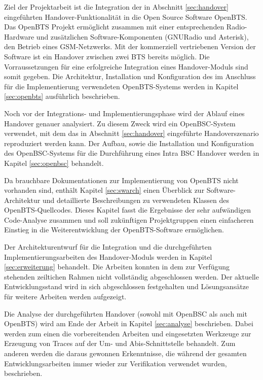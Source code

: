 Ziel der Projektarbeit ist die Integration der in Abschnitt \ref{sec:handover} eingeführten Handover-Funktionalität in die Open Source Software OpenBTS. Das OpenBTS Projekt ermöglicht zusammen mit einer entsprechenden Radio-Hardware und zusätzlichen Software-Komponenten (GNURadio und Asterisk), den Betrieb eines GSM-Netzwerks. Mit der kommerziell vertriebenen Version der Software ist ein Handover zwischen zwei BTS bereits möglich. Die Vorraussetzungen für eine erfolgreiche Integration eines Handover-Moduls sind somit gegeben. Die Architektur, Installation und Konfiguration des im Anschluss für die Implementierung verwendeten OpenBTS-Systems werden in Kapitel \ref{sec:openbts} ausführlich beschrieben.

Noch vor der Integrations- und Implementierungsphase wird der Ablauf eines Handover genauer analysiert. Zu diesem Zweck wird ein OpenBSC-System verwendet, mit dem das in Abschnitt \ref{sec:handover} eingeführte Handoverszenario reproduziert werden kann. Der Aufbau, sowie die Installation und Konfiguration des OpenBSC-Systems für die Durchführung eines Intra BSC Handover werden in Kapitel \ref{sec:openbsc} behandelt.

Da brauchbare Dokumentationen zur Implementierung von OpenBTS nicht vorhanden sind, enthält Kapitel \ref{sec:swarch} einen Überblick zur Software-Architektur und detaillierte Beschreibungen zu verwendeten Klassen des OpenBTS-Quellcodes. Dieses Kapitel fasst die Ergebnisse der sehr aufwändigen Code-Analyse zusammen und soll zukünftigen Projektgruppen einen einfacheren Einstieg in die Weiterentwicklung der OpenBTS-Software ermöglichen.

Der Architekturentwurf für die Integration und die durchgeführten Implementierungsarbeiten des Handover-Moduls werden in Kapitel \ref{sec:erweiterung} behandelt. Die Arbeiten konnten in dem zur Verfügung stehenden zeiltichen Rahmen nicht vollständig abgeschlossen werden. Der aktuelle Entwicklungsstand wird in sich abgeschlossen festgehalten und Lösungsansätze für weitere Arbeiten werden aufgezeigt.

Die Analyse der durchgeführten Handover (sowohl mit OpenBSC als auch mit OpenBTS) wird am Ende der Arbeit in Kapitel \ref{sec:analyse} beschrieben. Dabei werden zum einen die vorbereitenden Arbeiten und eingesetzten Werkzeuge zur Erzeugung von Traces auf der Um- und Abis-Schnittstelle behandelt. Zum anderen werden die daraus gewonnen Erkenntnisse, die während der gesamten Entwicklungsarbeiten immer wieder zur Verifikation verwendet wurden, beschrieben.

